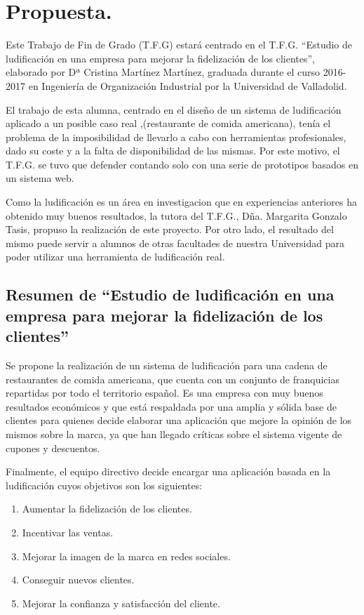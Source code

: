 \documentclass[twoside]{report}
\begin{document}
\section{Propuesta.}
Este Trabajo de Fin de Grado (T.F.G) estará centrado en el T.F.G. \cite{cristinatfg} “Estudio de ludificación en una empresa para mejorar la fidelización de los clientes”, elaborado por Dª Cristina Martínez Martínez, graduada durante el curso 2016-2017 en Ingeniería de Organización Industrial por la Universidad de Valladolid.  

El trabajo de esta alumna, centrado en el diseño de un sistema de ludificación aplicado a un posible caso real ,(restaurante de comida americana), tenía el problema de la imposibilidad de llevarlo a cabo con herramientas profesionales, dado su coste y a la falta de disponibilidad de las mismas. Por este motivo, el T.F.G. se tuvo que defender contando solo con una serie de prototipos basados en un sistema web. 

Como la ludificación es un área en investigacion que en experiencias anteriores ha obtenido muy buenos resultados, la tutora del T.F.G., Dña. Margarita Gonzalo Tasis, propuso la realización de este proyecto. Por otro lado, el resultado del mismo puede servir a alumnos de otras facultades de nuestra Universidad para poder utilizar una herramienta de ludificación real.

\subsection{Resumen de “Estudio de ludificación en una empresa para mejorar la fidelización de los clientes”}

Se propone la realización de un sistema de ludificación para una cadena de restaurantes de comida americana, que cuenta con un conjunto de franquicias repartidas por todo el territorio español. Es una empresa con muy buenos resultados económicos y que está respaldada por una amplia y sólida base de clientes para quienes decide elaborar una aplicación que mejore la opinión de los mismos sobre la marca, ya que han llegado críticas sobre el sistema vigente de cupones y descuentos.

Finalmente, el equipo directivo decide encargar una aplicación basada en la ludificación cuyos objetivos son los siguientes:

\begin{enumerate}
\item Aumentar la fidelización de los clientes.
\item Incentivar las ventas.
\item Mejorar la imagen de la marca en redes sociales.
\item Conseguir nuevos clientes.
\item Mejorar la confianza y satisfacción del cliente. 
\end{enumerate}
\end{document}
